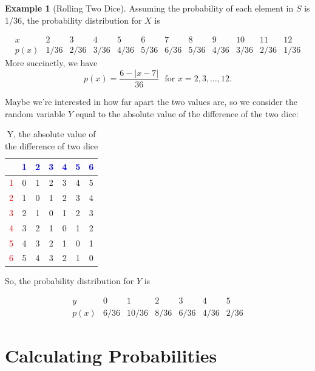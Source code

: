 \documentclass[
]{book}
\theoremstyle{definition}
\theoremstyle{definition}
\newtheorem{example}{Example}[chapter]
\theoremstyle{definition}
\theoremstyle{definition}
\theoremstyle{remark}
\begin{document}
\begin{example}[Rolling Two Dice]
Assuming the probability of each element in \(S\) is 1/36, the probability distribution for \(X\) is

\[
\begin{array}{c|c|c|c|c|c|c|c|c|c|c|c}
x & 2 & 3 & 4 & 5 & 6 & 7 & 8 & 9 & 10 & 11 & 12 \\ \hline
p(x) & 1/36 & 2/36 & 3/36 & 4/36 & 5/36 & 6/36 & 5/36 & 4/36 & 3/36 & 2/36 & 1/36 
\end{array}
\]
More succinctly, we have \[p(x) = \frac{6-|x-7|}{36} ~~~\text {for } x= 2, 3, \ldots, 12.\]

Maybe we're interested in how far apart the two values are, so we consider the random variable \(Y\) equal to the absolute value of the difference of the two dice:

\begin{table}[!h]
\centering\centering
\caption{\label{tab:diff-2-dice}Y, the absolute value of the difference of two dice}
\centering
\begin{tabular}[t]{>{}l||>{}c|c|c|c|c|c}
\hline
\textcolor{blue}{ } & \textcolor{blue}{1} & \textcolor{blue}{2} & \textcolor{blue}{3} & \textcolor{blue}{4} & \textcolor{blue}{5} & \textcolor{blue}{6}\\
\hline
\textcolor{red}{1} & 0 & 1 & 2 & 3 & 4 & 5\\
\hline
\textcolor{red}{2} & 1 & 0 & 1 & 2 & 3 & 4\\
\hline
\textcolor{red}{3} & 2 & 1 & 0 & 1 & 2 & 3\\
\hline
\textcolor{red}{4} & 3 & 2 & 1 & 0 & 1 & 2\\
\hline
\textcolor{red}{5} & 4 & 3 & 2 & 1 & 0 & 1\\
\hline
\textcolor{red}{6} & 5 & 4 & 3 & 2 & 1 & 0\\
\hline
\end{tabular}
\end{table}

\end{example}

So, the probability distribution for \(Y\) is

\[
\begin{array}{c|c|c|c|c|c|c}
y & 0 & 1 & 2 & 3 & 4 & 5 \\ \hline
p(x) & 6/36 & 10/36 & 8/36 & 6/36 & 4/36 & 2/36 
\end{array}
\]

\section{Calculating Probabilities}\label{calculating-probabilities}
\end{document}
